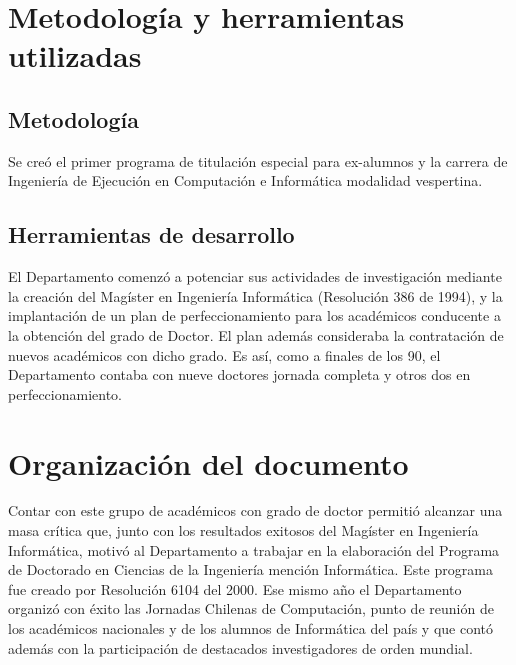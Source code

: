 \section{Metodolog\'ia y herramientas utilizadas}
\label{intro:metodologia}

\subsection{Metodolog\'ia}
Se creó el primer programa de titulación especial para ex-alumnos y la carrera de Ingeniería de Ejecución en Computación e Informática modalidad vespertina.

\subsection{Herramientas de desarrollo}
El Departamento comenzó a potenciar sus actividades de investigación mediante la creación del Magíster en Ingeniería Informática (Resolución 386 de 1994), y la implantación de un plan de perfeccionamiento para los académicos conducente a la obtención del grado de Doctor. El plan además consideraba la contratación de nuevos académicos con dicho grado. Es así, como a finales de los 90, el Departamento contaba con nueve doctores jornada completa y otros dos en perfeccionamiento.

\section{Organizaci\'on del documento}
\label{intro:organizacion}
Contar con este grupo de académicos con grado de doctor permitió alcanzar una masa crítica que, junto con los resultados exitosos del Magíster en Ingeniería Informática, motivó al Departamento a trabajar en la elaboración del Programa de Doctorado en Ciencias de la Ingeniería mención Informática. Este programa fue creado por Resolución 6104 del 2000. Ese mismo año el Departamento organizó con éxito las Jornadas Chilenas de Computación, punto de reunión de los académicos nacionales y de los alumnos de Informática del país y que contó además con la participación de destacados investigadores de orden mundial.